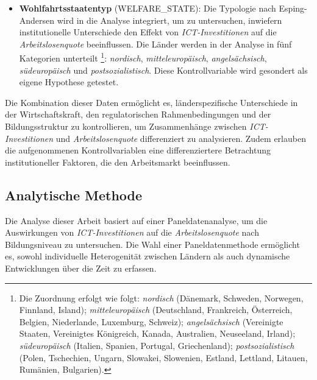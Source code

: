 \begin{itemize}
    \item \textbf{Wohlfahrtsstaatentyp} (WELFARE\_STATE): Die Typologie nach Esping-Andersen 
    \parencite{espingandersen1990thethree} wird in die Analyse integriert, um zu untersuchen, 
    inwiefern institutionelle Unterschiede den Effekt von \textit{\ac{ICT}-Investitionen} auf 
    die \textit{Arbeitslosenquote} beeinflussen. Die Länder werden in der Analyse in fünf 
    Kategorien unterteilt
    \footnote{
        Die Zuordnung erfolgt wie folgt: 
        \textit{nordisch} (Dänemark, Schweden, Norwegen, Finnland, Island); 
        \textit{mitteleuropäisch} (Deutschland, Frankreich, Österreich, Belgien, Niederlande, 
        Luxemburg, Schweiz); 
        \textit{angelsächsisch} 
        (Vereinigte Staaten, Vereinigtes Königreich, Kanada, Australien, Neuseeland, Irland); 
        \textit{südeuropäisch} (Italien, Spanien, Portugal, Griechenland); 
        \textit{postsozialistisch} (Polen, Tschechien, Ungarn, Slowakei, Slowenien, Estland, 
        Lettland, Litauen, Rumänien, Bulgarien).
    }: \textit{nordisch}, \textit{mitteleuropäisch}, \textit{angelsächsisch}, 
    \textit{südeuropäisch} und \textit{postsozialistisch}. Diese Kontrollvariable wird 
    gesondert als eigene Hypothese getestet.

\end{itemize}

Die Kombination dieser Daten ermöglicht es, länderspezifische Unterschiede in der 
Wirtschaftskraft, den regulatorischen Rahmenbedingungen und der Bildungsstruktur zu 
kontrollieren, um Zusammenhänge zwischen \textit{\ac{ICT}-Investitionen} und 
\textit{Arbeitslosenquote} differenziert zu analysieren. Zudem erlauben die aufgenommenen 
Kontrollvariablen eine differenziertere Betrachtung institutioneller Faktoren, die den 
Arbeitsmarkt beeinflussen. 


\subsection{Analytische Methode}

Die Analyse dieser Arbeit basiert auf einer Paneldatenanalyse, um die Auswirkungen von 
\textit{\ac{ICT}-Investitionen} auf die \textit{Arbeitslosenquote} nach Bildungsniveau zu 
untersuchen. Die Wahl einer Paneldatenmethode ermöglicht es, sowohl individuelle Heterogenität 
zwischen Ländern als auch dynamische Entwicklungen über die Zeit zu erfassen. 


